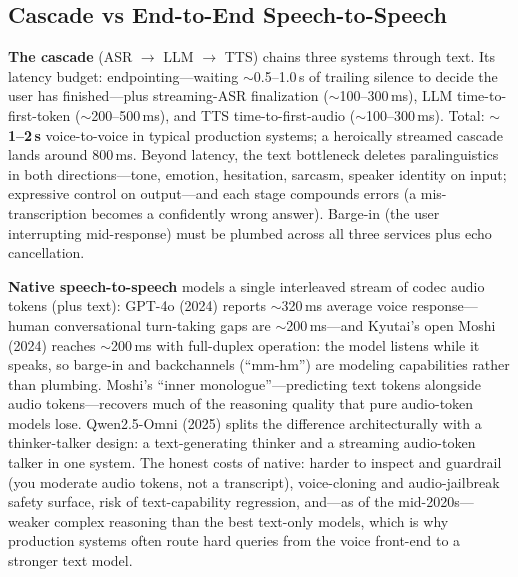 \subsection{Cascade vs End-to-End Speech-to-Speech}

\textbf{The cascade} (ASR $\rightarrow$ LLM $\rightarrow$ TTS) chains three systems through text. Its latency budget: endpointing---waiting $\sim$0.5--1.0\,s of trailing silence to decide the user has finished---plus streaming-ASR finalization ($\sim$100--300\,ms), LLM time-to-first-token ($\sim$200--500\,ms), and TTS time-to-first-audio ($\sim$100--300\,ms). Total: \textbf{$\sim$1--2\,s} voice-to-voice in typical production systems; a heroically streamed cascade lands around 800\,ms. Beyond latency, the text bottleneck deletes paralinguistics in both directions---tone, emotion, hesitation, sarcasm, speaker identity on input; expressive control on output---and each stage compounds errors (a mis-transcription becomes a confidently wrong answer). Barge-in (the user interrupting mid-response) must be plumbed across all three services plus echo cancellation.

\textbf{Native speech-to-speech} models a single interleaved stream of codec audio tokens (plus text): GPT-4o (2024) reports $\sim$320\,ms average voice response---human conversational turn-taking gaps are $\sim$200\,ms---and Kyutai's open Moshi (2024) reaches $\sim$200\,ms with full-duplex operation: the model listens while it speaks, so barge-in and backchannels (``mm-hm'') are modeling capabilities rather than plumbing. Moshi's ``inner monologue''---predicting text tokens alongside audio tokens---recovers much of the reasoning quality that pure audio-token models lose. Qwen2.5-Omni (2025) splits the difference architecturally with a thinker-talker design: a text-generating thinker and a streaming audio-token talker in one system. The honest costs of native: harder to inspect and guardrail (you moderate audio tokens, not a transcript), voice-cloning and audio-jailbreak safety surface, risk of text-capability regression, and---as of the mid-2020s---weaker complex reasoning than the best text-only models, which is why production systems often route hard queries from the voice front-end to a stronger text model.

